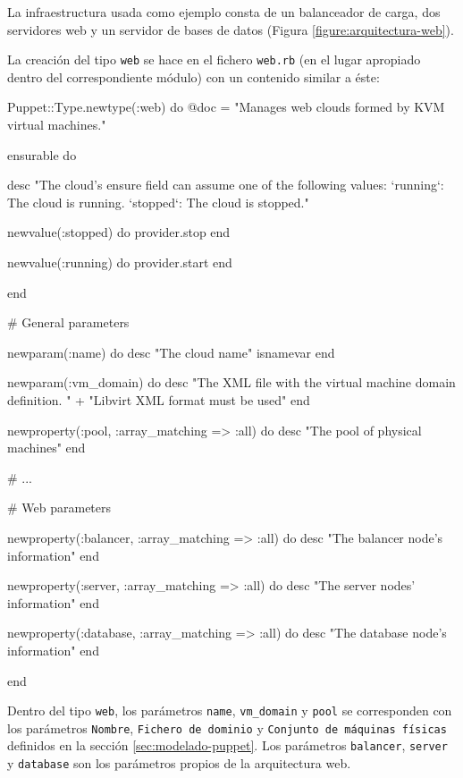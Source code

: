 La infraestructura usada como ejemplo consta de un balanceador de carga, dos servidores web y un servidor de bases de datos (Figura \ref{figure:arquitectura-web}).


La creación del tipo \texttt{web} se hace en el fichero \texttt{web.rb} (en el lugar apropiado dentro del correspondiente módulo) con un contenido similar a éste:

\begin{rubycode}
Puppet::Type.newtype(:web) do
   @doc = "Manages web clouds formed by KVM virtual machines."
   
   
   ensurable do

      desc "The cloud's ensure field can assume one of the following values:
   `running`: The cloud is running.
   `stopped`: The cloud is stopped.\n"
   
      newvalue(:stopped) do
         provider.stop
      end

      newvalue(:running) do
         provider.start
      end

   end


   # General parameters
   
   newparam(:name) do
      desc "The cloud name"
      isnamevar
   end
   
   newparam(:vm_domain) do
      desc "The XML file with the virtual machine domain definition. " +
           "Libvirt XML format must be used"
   end
   
   newproperty(:pool, :array_matching => :all) do
      desc "The pool of physical machines"
   end

   # ...


   # Web parameters
   
   newproperty(:balancer, :array_matching => :all) do
      desc "The balancer node's information"
   end
   
   newproperty(:server, :array_matching => :all) do
      desc "The server nodes' information"
   end
   
   newproperty(:database, :array_matching => :all) do
      desc "The database node's information"
   end

end

\end{rubycode}

Dentro del tipo \texttt{web}, los parámetros \texttt{name}, \texttt{vm\_domain} y \texttt{pool} se corresponden con los parámetros \texttt{Nombre}, \texttt{Fichero de dominio} y \texttt{Conjunto de máquinas físicas} definidos en la sección \ref{sec:modelado-puppet}. Los parámetros \texttt{balancer}, \texttt{server} y \texttt{database} son los parámetros propios de la arquitectura web.

